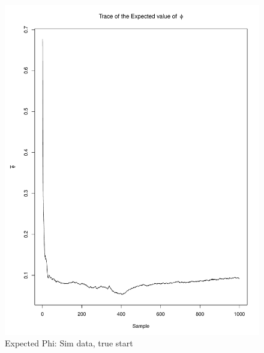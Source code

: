\documentclass[11pt]{labbook}
\begin{document}
    \begin{figure}
        \centering
        \includegraphics[scale=.65]{FONSE_Plots/2016/October_17/simulated_true_expectedPhi}
        \caption{Expected Phi: Sim data, true start}
        \label{fig:OCT17_S.T.EPHI}
    \end{figure}
\end{document}
